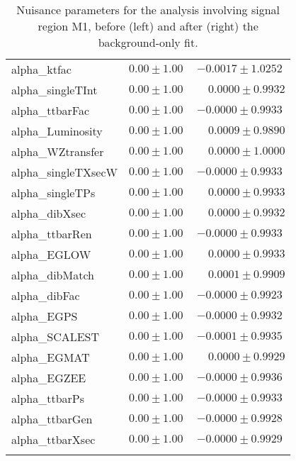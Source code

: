 \begin{table}
\begin{center}
\begin{tabular*}{\textwidth}{@{\extracolsep{\fill}}lcc}
alpha\_ktfac & $0.00\pm 1.00$  & $ -0.0017\pm 1.0252$  \\
alpha\_singleTInt & $0.00\pm 1.00$  & $ \phantom{-}0.0000\pm 0.9932$  \\
alpha\_ttbarFac & $0.00\pm 1.00$  & $ -0.0000\pm 0.9933$  \\
alpha\_Luminosity & $0.00\pm 1.00$  & $ \phantom{-}0.0009\pm 0.9890$  \\
alpha\_WZtransfer & $0.00\pm 1.00$  & $ \phantom{-}0.0000\pm 1.0000$  \\
alpha\_singleTXsecW & $0.00\pm 1.00$  & $ -0.0000\pm 0.9933$  \\
alpha\_singleTPs & $0.00\pm 1.00$  & $ \phantom{-}0.0000\pm 0.9933$  \\
alpha\_dibXsec & $0.00\pm 1.00$  & $ \phantom{-}0.0000\pm 0.9932$  \\
alpha\_ttbarRen & $0.00\pm 1.00$  & $ -0.0000\pm 0.9933$  \\
alpha\_EGLOW & $0.00\pm 1.00$  & $ \phantom{-}0.0000\pm 0.9933$  \\
alpha\_dibMatch & $0.00\pm 1.00$  & $ \phantom{-}0.0001\pm 0.9909$  \\
alpha\_dibFac & $0.00\pm 1.00$  & $ -0.0000\pm 0.9923$  \\
alpha\_EGPS & $0.00\pm 1.00$  & $ -0.0000\pm 0.9932$  \\
alpha\_SCALEST & $0.00\pm 1.00$  & $ -0.0001\pm 0.9935$  \\
alpha\_EGMAT & $0.00\pm 1.00$  & $ \phantom{-}0.0000\pm 0.9929$  \\
alpha\_EGZEE & $0.00\pm 1.00$  & $ -0.0000\pm 0.9936$  \\
alpha\_ttbarPs & $0.00\pm 1.00$  & $ -0.0000\pm 0.9933$  \\
alpha\_ttbarGen & $0.00\pm 1.00$  & $ -0.0000\pm 0.9928$  \\
alpha\_ttbarXsec & $0.00\pm 1.00$  & $ -0.0000\pm 0.9929$  \\
\noalign{\smallskip}\hline\noalign{\smallskip}
\end{tabular*}
\end{center}
\caption[Nuisance parameters for the analysis involving signal region M1, before and after the background-only fit.]{
Nuisance parameters for the analysis involving signal region M1, before (left) and after (right) the background-only fit.}
\label{tab:fitparameters_Stop_M1}
\end{table}
%
